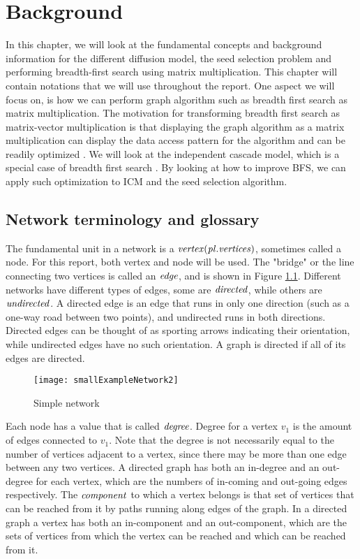 \chapter{Background} \label{background}

In this chapter, we will look at the fundamental concepts and background information for the different diffusion model, the seed selection problem and performing breadth-first search using matrix multiplication. This chapter will contain notations that we will use throughout the report. One aspect we will focus on, is how we can perform graph algorithm such as breadth first search as matrix multiplication. The motivation for transforming breadth first search as matrix-vector multiplication is that displaying the graph algorithm as a matrix multiplication can display the data access pattern for the algorithm and can be readily optimized  \cite{AlgoToMath}. We will look at the independent cascade model, which is a special case of breadth first search  \cite{HybridBFS2015}. By looking at how to improve BFS, we can apply such optimization to ICM and the seed selection algorithm. 


\section{Network terminology and glossary}
The fundamental unit in a network is a $\it{{vertex}} (pl. vertices)$, sometimes called a node. For this report, both vertex and node will be used. The "bridge" or the line connecting two vertices is called an $\it{{edge}}$, and is shown in Figure \ref{fig:SimpleGraph}.  Different networks have different types of edges, some are $\it{directed}$, while others are $\it {undirected}$. A directed edge is an edge that runs in only one direction (such as a one-way road between two points), and undirected runs in both directions. Directed edges can be thought of as sporting arrows indicating their orientation, while undirected edges have no such orientation. A graph is directed if all of its edges are directed.

\begin{figure}[!ht]
	\texttt{[image: smallExampleNetwork2]}
	\caption{Simple network} 
	\label{fig:SimpleGraph}
\end{figure}


Each node has a value that is called $\it{{degree}}$. Degree for a vertex $v_1$ is the amount of edges connected to $v_1$. Note that the degree is not necessarily equal to the number of vertices adjacent to a vertex, since there may be more than one edge between any two vertices. A directed graph has both an in-degree and an out-degree for each vertex, which are the numbers of in-coming and out-going edges respectively. The $\it{{component}}$ to which a vertex belongs is that set of vertices that can be reached from it by paths running along edges of the graph. In a directed graph a vertex has both an in-component and an out-component, which are the sets of vertices from which the vertex can be reached and which can be reached from it.

